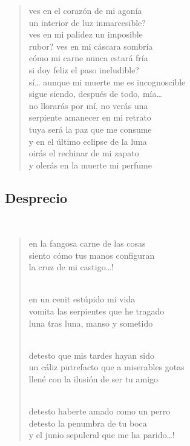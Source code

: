 \documentclass[a4paper, 12pt]{article}
\begin{document}
\normalsize
\begin{verse}

ves en el corazón de mi agonía\\
un interior de luz inmarcesible?\\
ves en mi palidez un imposible\\
rubor? ves en mi cáscara sombría\\
cómo mi carne nunca estará fría\\
si doy feliz el paso ineludible?\\
sí… aunque mi muerte me es incognoscible\\
sigue siendo, después de todo, mía…\\
no llorarás por mí, no verás una\\
serpiente amanecer en mi retrato\\
tuya será la paz que me consume\\
y en el último eclipse de la luna\\
oirás el rechinar de mi zapato\\
y olerás en la muerte mi perfume\\
\end{verse}

\pagebreak 
    
\subsection{Desprecio}
~
\begin{verse}
en la fangosa carne de las cosas\\
siento cómo tus manos configuran\\
la cruz de mi castigo…!\\
~

en un cenit estúpido mi vida\\
vomita las serpientes que he tragado\\
luna tras luna, manso y sometido\\
~

detesto que mis tardes hayan sido\\
un cáliz putrefacto que a miserables gotas\\
llené con la ilusión de ser tu amigo\\
~

detesto haberte amado como un perro\\
detesto la penumbra de tu boca\\
y el junio sepulcral que me ha parido…!\\
\end{verse}
\end{document}
